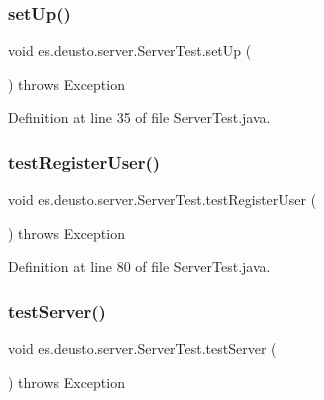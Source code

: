 \subsubsection{\texorpdfstring{set\+Up()}{setUp()}}
{\footnotesize\ttfamily void es.\+deusto.\+server.\+Server\+Test.\+set\+Up (\begin{DoxyParamCaption}{ }\end{DoxyParamCaption}) throws Exception}



Definition at line 35 of file Server\+Test.\+java.

\mbox{\label{classes_1_1deusto_1_1server_1_1_server_test_ab50ebca6957682f2a7e6e51dc06278cf}} 
\subsubsection{\texorpdfstring{test\+Register\+User()}{testRegisterUser()}}
{\footnotesize\ttfamily void es.\+deusto.\+server.\+Server\+Test.\+test\+Register\+User (\begin{DoxyParamCaption}{ }\end{DoxyParamCaption}) throws Exception}



Definition at line 80 of file Server\+Test.\+java.

\mbox{\label{classes_1_1deusto_1_1server_1_1_server_test_a9c697e77e1422a1d0835f6e6a38036f4}} 
\subsubsection{\texorpdfstring{test\+Server()}{testServer()}}
{\footnotesize\ttfamily void es.\+deusto.\+server.\+Server\+Test.\+test\+Server (\begin{DoxyParamCaption}{ }\end{DoxyParamCaption}) throws Exception}



